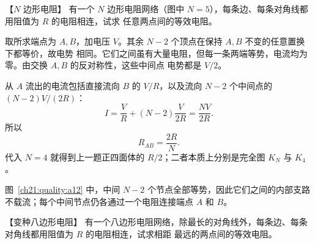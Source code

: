 {\begin{origexamplebox}{【$N$ 边形电阻】}\label{ch21:ex:s37-6-4}
有一个 $N$ 边形电阻网络（图中 $N=5$），每条边、每条对角线都用阻值为 $R$ 的电阻相连，试求
任意两点间的等效电阻。
\par\noindent\begin{minipage}{\linewidth}
\completeGraphProblemFigure
{}
\end{minipage}\par\medskip
\end{origexamplebox}\par\nopagebreak[4]


\begin{xesolution}
取所求端点为 $A,B$，加电压 $V$。其余 $N-2$ 个顶点在保持 $A,B$ 不变的任意置换下都等价，故电势
相同。它们之间虽有大量电阻，但每一条两端等势，电流均为零。由交换 $A,B$ 的反对称性，这些中间点
电势都是 $V/2$。

从 $A$ 流出的电流包括直接流向 $B$ 的 $V/R$，以及流向 $N-2$ 个中间点的
$(N-2)V/(2R)$：
\[
  I=\frac VR+(N-2)\frac{V}{2R}=\frac{NV}{2R}.
\]
所以
\[
  \boxed{R_{AB}=\frac{2R}{N}}.
\]
代入 $N=4$ 就得到上一题正四面体的 $R/2$；二者本质上分别是完全图 $K_N$ 与 $K_4$。

\par\noindent\begin{minipage}{\linewidth}
\completeGraphReductionFigure
{}
\end{minipage}\par\medskip

图~\ref{ch21:quality:a12} 中，中间 $N-2$ 个节点全部等势，因此它们之间的内部支路不载流；每个中间节点仍各通过一个电阻连接端点 $A$ 和 $B$。
\end{xesolution}



\begin{origexamplebox}{【变种八边形电阻】}\label{ch21:ex:s37-6-5}
有一个八边形电阻网络，除最长的对角线外，每条边、每条对角线都用阻值为 $R$ 的电阻相连，试求相距
最远的两点间的等效电阻。
\par\noindent\begin{minipage}{\linewidth}
\octagonProblemFigure
{}
\end{minipage}\par\medskip
\end{origexamplebox}\par\nopagebreak[4]


}
